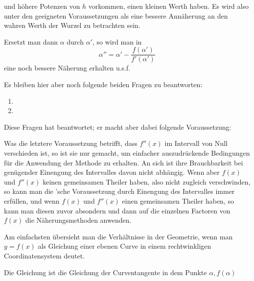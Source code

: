 und höhere Potenzen von $h$ vorkommen, einen kleinen Werth haben. Es
wird also unter den geeigneten Voraussetzungen
als eine bessere Annäherung an den wahren Werth der Wurzel zu betrachten
sein.

Ersetzt man dann $\alpha$ durch $\alpha'$, so wird man in
\[ \alpha'' = \alpha' - \frac{f(\alpha')}{f'(\alpha')} \]
eine noch bessere Näherung erhalten u.s.f.

Es bleiben hier aber noch folgende beiden Fragen zu beantworten:
\begin{enumerate}
\item[1.] 
\item[2.] 
\end{enumerate}
Diese Fragen hat  beantwortet; er macht aber dabei
folgende Voraussetzung:



Was die letztere Voraussetzung betrifft, dass $f''(x)$ im Intervall von
Null verschieden ist, so ist sie nur gemacht, um einfacher
auszudrückende Bedingungen für die Anwendung der Methode zu erhalten.
An sich ist ihre Brauchbarkeit bei genügender Einengung des Intervalles
davon nicht abhängig. Wenn aber $f(x)$ und $f''(x)$ keinen gemeinsamen
Theiler haben, also nicht zugleich verschwinden, so kann man die
'sche Voraussetzung durch Einengung des Intervalles
immer erfüllen, und wenn $f(x)$ und $f''(x)$ einen gemeinsamen Theiler
haben, so kann man diesen zuvor absondern und dann auf die einzelnen
Factoren von $f(x)$ die Näherungsmethoden anwenden.

Am einfachsten übersieht man die Verhältnisse in der Geometrie, wenn
man $y=f(x)$ als Gleichung einer ebenen Curve in einem rechtwinkligen
Coordinatensystem deutet.

Die Gleichung
ist die Gleichung der Curventangente in dem Punkte $\alpha, f(\alpha)$

